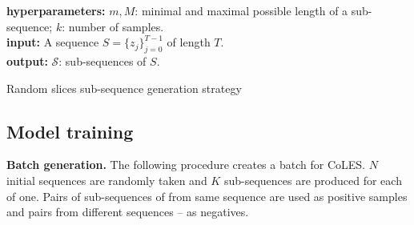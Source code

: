 \documentclass[sigconf]{acmart}
\begin{document}
\begin{algorithm}
    \SetAlgoLined
    \textbf{hyperparameters:}
        $m, M$: minimal and maximal possible length of a sub-sequence;
        $k$: number of samples.
    \\ %
    \textbf{input:}
        A sequence $S = \{z_j\}_{j=0}^{T-1}$ of length $T$.
    \\
    \textbf{output:}
        $\mathcal{S}$: sub-sequences of $S$.
    \\
    \BlankLine
    \For{$i\leftarrow 1$ \KwTo $k$}{
        Generate a random integer $T_i$ uniformly from $[1, T]$;
        \\
        \uIf{$T_i\in [m, M]$}{  %
            Generate a random integer $s$ from $[0, T - T_i)$;
            \\
            Add the slice $
                \tilde{S}_i := \bigl\{z_{s + j}\bigr\}_{j=0}^{T_i - 1}  %
            $ to $\mathcal{S}$;
            \\
        }
    }
    \caption{Random slices sub-sequence generation strategy}
    \label{alg-slce-ss}
\end{algorithm}


\subsection{Model training} \label{sec-training}

\textbf{Batch generation.} The following procedure creates a batch for CoLES. $N$ initial
sequences are randomly taken and $K$ sub-sequences are produced for each of one. Pairs of
sub-sequences of from same sequence are used as positive samples and pairs from different
sequences -- as negatives.

\end{document}
